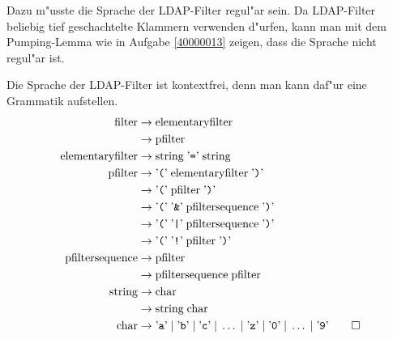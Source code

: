 \begin{loesung}
\begin{teilaufgaben}
\item
Dazu m"usste die Sprache der LDAP-Filter regul"ar sein.
Da LDAP-Filter beliebig tief geschachtelte Klammern verwenden d"urfen,
kann man mit dem Pumping-Lemma wie in Aufgabe \ref{40000013} zeigen,
dass die Sprache nicht regul"ar ist.
\item
Die Sprache der LDAP-Filter ist kontextfrei, denn man kann daf"ur
eine Grammatik aufstellen.
\begin{align*}
\text{filter}
        &\rightarrow\text{elementaryfilter}\\
        &\rightarrow\text{pfilter}\\
\text{elementaryfilter}
        &\rightarrow \text{string} \;\text{'{\tt =}'}\; \text{string}\\
\text{pfilter}
        &\rightarrow \text{'{\tt (}'}\;\text{elementaryfilter}\;\text{'{\tt )}'} \\
        &\rightarrow \text{'{\tt (}'}\;\text{pfilter}\;\text{'{\tt )}'} \\
        &\rightarrow \text{'{\tt (}'}\; \text{'{\tt \&}'}\;
                \text{pfiltersequence}\;\text{'{\tt )}'} \\
        &\rightarrow \text{'{\tt (}'}\; \text{'{\tt |}'}\;
                \text{pfiltersequence}\;\text{'{\tt )}'} \\
        &\rightarrow \text{'{\tt (}'}\; \text{'{\tt !}'}\;
                \text{pfilter}\;\text{'{\tt )}'} \\
\text{pfiltersequence}
        &\rightarrow \text{pfilter}\\
        &\rightarrow \text{pfiltersequence}\;\text{pfilter}\\
\text{string}
        &\rightarrow \text{char}\\
        &\rightarrow \text{string} \; \text{char}\\
\text{char}
        &\rightarrow
\text{'{\tt a}'}\;|\;
\text{'{\tt b}'}\;|\;
\text{'{\tt c}'}\;|\;\dots\;|\;
\text{'{\tt z}'}\;|\;
\text{'{\tt 0}'}\;|\;\dots\;|\;
\text{'{\tt 9}'}
\qedhere
\end{align*}
\end{teilaufgaben}
\end{loesung}

